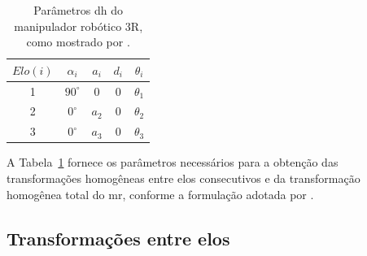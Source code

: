\begin{table}[H]
\centering
\caption{Parâmetros \gls{dh} do manipulador robótico 3R, como mostrado por \cite{sciavicco_siciliano2010}.}
\label{tab_dh_zxx}
\begin{tabular}{c|c|c|c|c}
$Elo (i)$ & $\alpha_i$ & $a_i$ & $d_i$ & $\theta_i$ \\
\hline
1 & $90^\circ$ & $0$   & 0 & $\theta_1$ \\
2 & $0^\circ$  & $a_2$ & 0 & $\theta_2$ \\
3 & $0^\circ$  & $a_3$ & 0 & $\theta_3$
\end{tabular}
\end{table}

A Tabela~\ref{tab_dh_zxx} fornece os parâmetros necessários para a obtenção das transformações homogêneas entre elos consecutivos e da transformação homogênea total do \gls{mr}, conforme a formulação adotada por \cite{sciavicco_siciliano2010}.

\subsection{Transformações entre elos}
\label{sec_transformacoes_elos}


